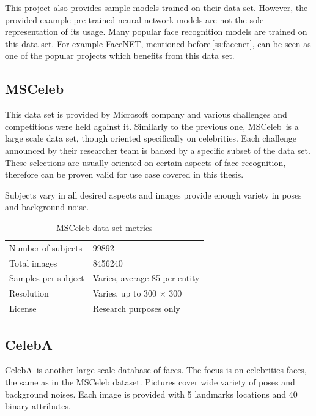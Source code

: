 This project also provides sample models trained on their data set. However, the provided example pre-trained neural network models are not the sole representation of its usage. Many popular face recognition models are trained on this data set. For example FaceNET, mentioned before\,\ref{ss:facenet}, can be seen as one of the popular projects which benefits from this data set.

\subsection{MSCeleb}

This data set is provided by Microsoft company and various challenges and competitions were held against it. Similarly to the previous one, MSCeleb\,\cite{msceleb} is a large scale data set, though oriented specifically on celebrities. Each challenge announced by their researcher team is backed by a specific subset of the data set. These selections are usually oriented on certain aspects of face recognition, therefore can be proven valid for use case covered in this thesis.

Subjects vary in all desired aspects and images provide enough variety in poses and background noise.

\begin{table}[ht]
    \centering
    \begin{tabularx}{.8\textwidth}{l|X}
        \toprule
        Number of subjects & \num{99892} \\
        Total images & \num{8456240} \\
        Samples per subject & Varies, average 85 per entity \\
        Resolution & Varies, up to 300 $\times$ 300 \\
        License & Research purposes only \\
        \bottomrule
    \end{tabularx}
    \caption{MSCeleb data set metrics}
\end{table}

\subsection{CelebA}

CelebA\,\cite{celeba} is another large scale database of faces. The focus is on celebrities faces, the same as in the MSCeleb dataset. Pictures cover wide variety of poses and background noises. Each image is provided with 5 landmarks locations and 40 binary attributes.

